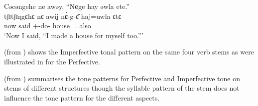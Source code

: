 \ea\label{ex:7:56}
Cəcəngehe  ne awəy,  “N\textbf{e}ge  hay  əwla  ete.”\\
\gll tʃɪtʃɪŋgɛhɛ   nɛ  awij     n\textbf{\`ɛ}{}-g-\=ɛ     haj=uwla     ɛtɛ\\
now    {\oneS}  said    {\oneS}+{\PFV}-do-{\CL}  house={\oneS}.{\POSS}  also\\
\glt ‘Now I said, “I made a house for myself too.”’
\z

 (from \citealt{FriesenMamalis2008}) shows the Imperfective tonal pattern on the same four verb stems as were illustrated in  for the Perfective.

\begin{table}
\caption{Imperfective tone\label{tab:60}}
\end{table}

 (from \citealt{FriesenMamalis2008}) summarises the tone patterns for Perfective and Imperfective tone on stems of different structures though the syllable pattern of the stem does not influence the tone pattern for the different aspects.

